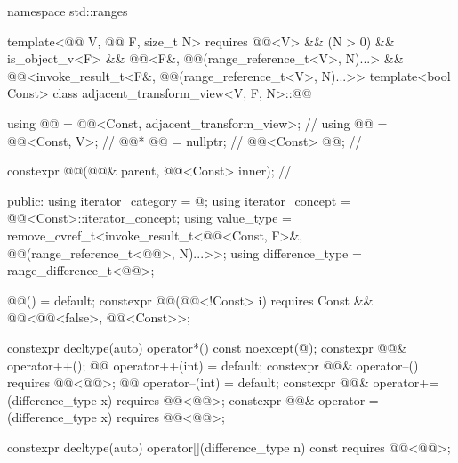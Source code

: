 %
\begin{codeblock}
namespace std::ranges {
  template<@@ V, @@ F, size_t N>
    requires @@<V> && (N > 0) && is_object_v<F> &&
             @@<F&, @@(range_reference_t<V>, N)...> &&
             @@<invoke_result_t<F&, @@(range_reference_t<V>, N)...>>
  template<bool Const>
  class adjacent_transform_view<V, F, N>::@@ {
    using @@ = @@<Const, adjacent_transform_view>;         // \expos
    using @@ = @@<Const, V>;                                 // \expos
    @@* @@ = nullptr;                                          // \expos
    @@<Const> @@;                                       // \expos

    constexpr @@(@@& parent, @@<Const> inner);    // \expos

  public:
    using iterator_category = @\seebelow@;
    using iterator_concept  = @@<Const>::iterator_concept;
    using value_type =
      remove_cvref_t<invoke_result_t<@@<Const, F>&,
                                     @@(range_reference_t<@@>, N)...>>;
    using difference_type = range_difference_t<@@>;

    @@() = default;
    constexpr @@(@@<!Const> i)
      requires Const && @@<@@<false>, @@<Const>>;

    constexpr decltype(auto) operator*() const noexcept(@\seebelow@);
    constexpr @@& operator++();
    @@ operator++(int) = default;
    constexpr @@& operator--() requires @@<@@>;
    @@ operator--(int) = default;
    constexpr @@& operator+=(difference_type x) requires @@<@@>;
    constexpr @@& operator-=(difference_type x) requires @@<@@>;

    constexpr decltype(auto) operator[](difference_type n) const
      requires @@<@@>;

}}
\end{codeblock}
